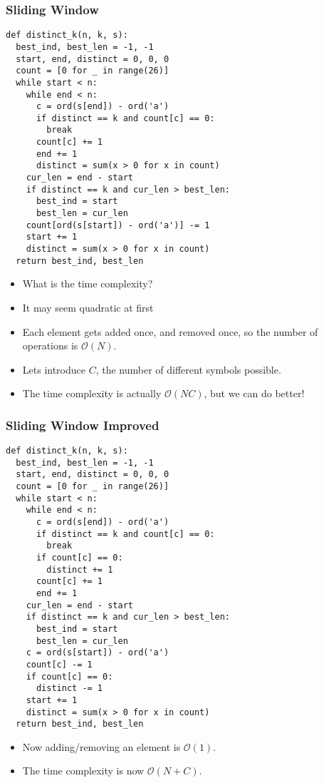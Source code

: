 \documentclass{beamer}
\begin{document}
\begin{frame}
    \frametitle{Sliding Window}
	\begin{scriptsize}
        \begin{verbatim}
def distinct_k(n, k, s):
  best_ind, best_len = -1, -1
  start, end, distinct = 0, 0, 0
  count = [0 for _ in range(26)]
  while start < n:
    while end < n:
      c = ord(s[end]) - ord('a')
      if distinct == k and count[c] == 0:
        break
      count[c] += 1
      end += 1
      distinct = sum(x > 0 for x in count)
    cur_len = end - start
    if distinct == k and cur_len > best_len:
      best_ind = start
      best_len = cur_len
    count[ord(s[start]) - ord('a')] -= 1
    start += 1
    distinct = sum(x > 0 for x in count)
  return best_ind, best_len
        \end{verbatim}
    \end{scriptsize}
    \begin{itemize}
        \item<2-> What is the time complexity?
        \item<3-> It may seem quadratic at first
        \item<4-> Each element gets added once, and removed once, so the number of operations is $\mathcal{O}(N)$.
        \item<6-> Lets introduce $C$, the number of different symbols possible.
        \item<7-> The time complexity is actually $\mathcal{O}(NC)$, but we can do better!
    \end{itemize}
\end{frame}


\begin{frame}
    \frametitle{Sliding Window Improved}
	\begin{scriptsize}
        \begin{verbatim}
def distinct_k(n, k, s):
  best_ind, best_len = -1, -1
  start, end, distinct = 0, 0, 0
  count = [0 for _ in range(26)]
  while start < n:
    while end < n:
      c = ord(s[end]) - ord('a')
      if distinct == k and count[c] == 0:
        break
      if count[c] == 0:
        distinct += 1
      count[c] += 1
      end += 1
    cur_len = end - start
    if distinct == k and cur_len > best_len:
      best_ind = start
      best_len = cur_len
    c = ord(s[start]) - ord('a')
    count[c] -= 1
    if count[c] == 0:
      distinct -= 1
    start += 1
    distinct = sum(x > 0 for x in count)
  return best_ind, best_len
        \end{verbatim}
    \end{scriptsize}
    \begin{itemize}
        \item<2-> Now adding/removing an element is $\mathcal{O}(1)$.
        \item<3-> The time complexity is now $\mathcal{O}(N + C)$.
    \end{itemize}
\end{frame}
\end{document}
